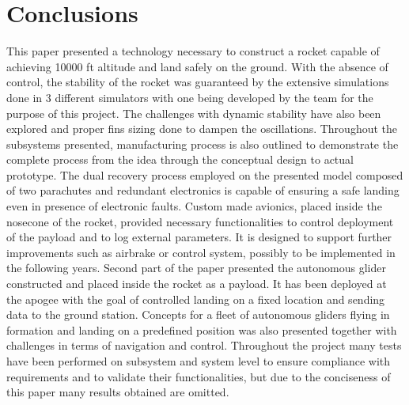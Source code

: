 \documentclass[]{iac}
\begin{document}





\section{Conclusions}
This paper presented a technology necessary to construct a rocket capable of achieving 10000 ft altitude and land safely on the ground. With the absence of control, the stability of the rocket was guaranteed by the extensive simulations done in 3 different simulators with one being developed by the team for the purpose of this project. The challenges with dynamic stability have also been explored and proper fins sizing done to dampen the oscillations. Throughout the subsystems presented, manufacturing process is also outlined to demonstrate the complete process from the idea through the conceptual design to actual prototype. 
The dual recovery process employed on the presented model composed of two parachutes and redundant electronics is capable of ensuring a safe landing even in presence of electronic faults. Custom made avionics, placed inside the nosecone of the rocket, provided necessary functionalities to control deployment of the payload and to log external parameters. It is designed to support further improvements such as airbrake or control system, possibly to be implemented in the following years. 
Second part of the paper presented the autonomous glider constructed and placed inside the rocket as a payload. It has been deployed at the apogee with the goal of controlled landing on a fixed location and sending data to the ground station. Concepts for a fleet of autonomous gliders flying in formation and landing on a predefined position was also presented together with challenges in terms of navigation and control. Throughout the project many tests have been performed on subsystem and system level to ensure compliance with requirements and to validate their functionalities, but due to the conciseness of this paper many results obtained are omitted. 
\end{document}
